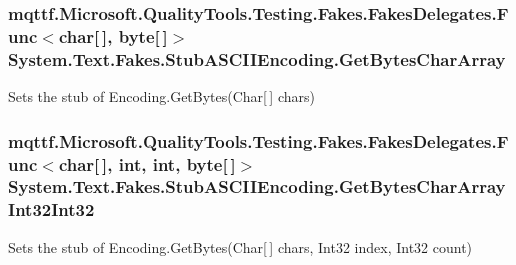 \hypertarget{class_system_1_1_text_1_1_fakes_1_1_stub_a_s_c_i_i_encoding_a5b6a6923cef900fa435c7c0766f78850}{
\subsubsection[{Get\-Bytes\-Char\-Array}]{\setlength{\rightskip}{0pt plus 5cm}mqttf.\-Microsoft.\-Quality\-Tools.\-Testing.\-Fakes.\-Fakes\-Delegates.\-Func$<$char\mbox{[}$\,$\mbox{]}, byte\mbox{[}$\,$\mbox{]}$>$ System.\-Text.\-Fakes.\-Stub\-A\-S\-C\-I\-I\-Encoding.\-Get\-Bytes\-Char\-Array}}\label{class_system_1_1_text_1_1_fakes_1_1_stub_a_s_c_i_i_encoding_a5b6a6923cef900fa435c7c0766f78850}


Sets the stub of Encoding.\-Get\-Bytes(\-Char\mbox{[}$\,$\mbox{]} chars)

\hypertarget{class_system_1_1_text_1_1_fakes_1_1_stub_a_s_c_i_i_encoding_a2c03b56709f13b0c1bd0258f5b34afc2}{
\subsubsection[{Get\-Bytes\-Char\-Array\-Int32\-Int32}]{\setlength{\rightskip}{0pt plus 5cm}mqttf.\-Microsoft.\-Quality\-Tools.\-Testing.\-Fakes.\-Fakes\-Delegates.\-Func$<$char\mbox{[}$\,$\mbox{]}, int, int, byte\mbox{[}$\,$\mbox{]}$>$ System.\-Text.\-Fakes.\-Stub\-A\-S\-C\-I\-I\-Encoding.\-Get\-Bytes\-Char\-Array\-Int32\-Int32}}\label{class_system_1_1_text_1_1_fakes_1_1_stub_a_s_c_i_i_encoding_a2c03b56709f13b0c1bd0258f5b34afc2}


Sets the stub of Encoding.\-Get\-Bytes(\-Char\mbox{[}$\,$\mbox{]} chars, Int32 index, Int32 count)

